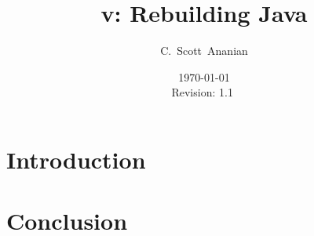\documentclass[11pt,notitlepage,twocolumn]{article}
\author{C.~Scott~Ananian}
\title{v: Rebuilding Java}
\date{\today \\ $ $Revision: 1.1 $ $}
\begin{document}

\maketitle

\section{Introduction}

\section{Conclusion}


\end{document}
